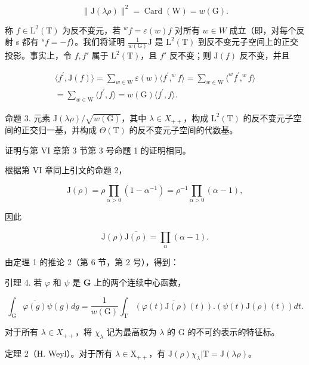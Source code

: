\[
\| \mathrm{J} (\lambda \rho) \| ^ {2} = \operatorname{Card} (\mathrm{W}) = w (\mathrm{G}).
\]

称 \(f \in \mathrm{L}^{2}(\mathrm{T})\) 为反不变元，若 \(^{w}f = \varepsilon(w)f\) 对所有 \(w \in W\) 成立（即，对每个反射 s 都有 \(^{s}f = -f\)）。我们将证明 \(\frac{1}{w(\mathrm{G})}\mathrm{J}\) 是 \(\mathrm{L}^{2}(\mathrm{T})\) 到反不变元子空间上的正交投影。事实上，令 \(f, f'\) 属于 \(\mathrm{L}^{2}(\mathrm{T})\)，且 \(f'\) 反不变；则 \(\mathrm{J}(f)\) 反不变，并且

\[
\begin{array}{c} \langle f ^ {\prime}, \mathrm{J} (f) \rangle = \sum_ {w \in \mathrm{W}} \varepsilon (w) \langle f ^ {\prime},   ^ {w} f \rangle = \sum_ {w \in \mathrm{W}} \langle^ {w} f ^ {\prime},   ^ {w} f \rangle \\ = \sum_ {w \in \mathrm{W}} \langle f ^ {\prime},   f \rangle = w (\mathrm{G}) \langle f ^ {\prime},   f \rangle . \end{array}
\]

命题 3. 元素 \(\mathrm{J}(\lambda\rho)/\sqrt{w(\mathrm{G})}\)，其中 \(\lambda\in X_{++}\)，构成 \(\mathrm{L}^{2}(\mathrm{T})\) 的反不变元子空间的正交归一基，并构成 \(\Theta(\mathrm{T})\) 的反不变元子空间的代数基。

证明与第 VI 章第 3 节第 3 号命题 1 的证明相同。

根据第 VI 章同上引文的命题 2，

\[
\mathrm{J} (\rho) = \rho \prod_ {\alpha > 0} (1 - \alpha^ {- 1}) = \rho^ {- 1} \prod_ {\alpha > 0} (\alpha - 1),\tag{3}
\]

因此

\[
\mathrm{J} (\rho) \overline {{\mathrm{J} (\rho)}} = \prod_ {\alpha} (\alpha - 1).\tag{4}
\]

由定理 1 的推论 2（第 6 节，第 2 号），得到：

引理 4. 若 \(\varphi\) 和 \(\psi\) 是 \(\mathbf{G}\) 上的两个连续中心函数，

\[
\int_ {\mathrm{G}} \overline {{\varphi (g)}} \psi (g) d g = \frac {1}{w (\mathrm{G})} \int_ {\mathrm{T}} \overline {{(\varphi (t) \mathrm{J} (\rho) (t))}}. (\psi (t) \mathrm{J} (\rho) (t)) d t.
\]

对于所有 \(\lambda\in X_{++}\)，将 \(\chi_{\lambda}\) 记为最高权为 \(\lambda\) 的 G 的不可约表示的特征标。

定理 2（H. Weyl）。对于所有 \(\lambda \in \mathrm{X}_{++}\)，有 \(\mathrm{J}(\rho)\chi_{\lambda}|\mathrm{T} = \mathrm{J}(\lambda \rho)\)。

